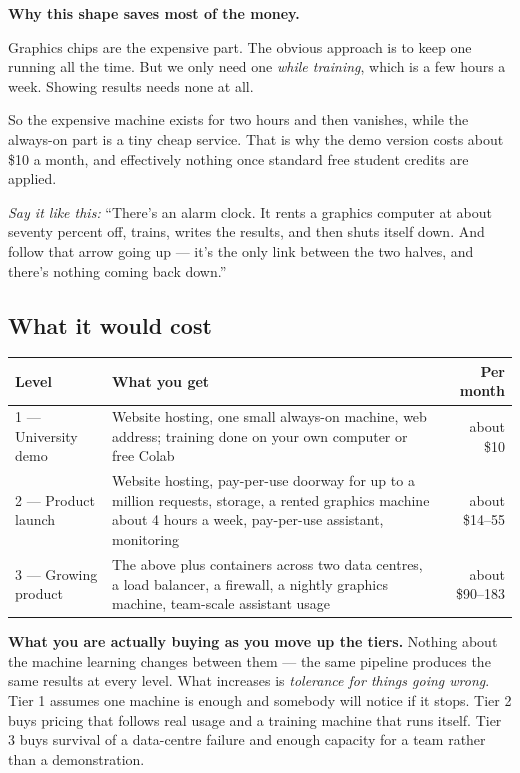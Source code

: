 \documentclass[11pt,a4paper]{article}
\newcommand{\aloud}[1]{\par\smallskip\noindent\textit{\textcolor{accent}{Say
it like this:}} ``#1''\par\smallskip}
\begin{document}
\begin{keybox}
\textbf{Why this shape saves most of the money.}

Graphics chips are the expensive part. The obvious approach is to keep one
running all the time. But we only need one \emph{while training}, which is a few
hours a week. Showing results needs none at all.

So the expensive machine exists for two hours and then vanishes, while the
always-on part is a tiny cheap service. That is why the demo version costs about
\$10 a month, and effectively nothing once standard free student credits are
applied.
\end{keybox}

\aloud{There's an alarm clock. It rents a graphics computer at about seventy
percent off, trains, writes the results, and then shuts itself down. And follow
that arrow going up --- it's the only link between the two halves, and there's
nothing coming back down.}

\subsection{What it would cost}

\begin{center}\small
\begin{tabular}{@{}p{4.4cm}p{7.4cm}r@{}}
\toprule
\textbf{Level} & \textbf{What you get} & \textbf{Per month} \\
\midrule
1 --- University demo & Website hosting, one small always-on machine, web address;
training done on your own computer or free Colab & about \$10 \\
2 --- Product launch & Website hosting, pay-per-use doorway for up to a million
requests, storage, a rented graphics machine about 4 hours a week,
pay-per-use assistant, monitoring & about \$14--55 \\
3 --- Growing product & The above plus containers across two data centres, a load
balancer, a firewall, a nightly graphics machine, team-scale assistant usage &
about \$90--183 \\
\bottomrule
\end{tabular}
\end{center}

\textbf{What you are actually buying as you move up the tiers.} Nothing about
the machine learning changes between them --- the same pipeline produces the
same results at every level. What increases is \emph{tolerance for things going
wrong}. Tier 1 assumes one machine is enough and somebody will notice if it
stops. Tier 2 buys pricing that follows real usage and a training machine that
runs itself. Tier 3 buys survival of a data-centre failure and enough capacity
for a team rather than a demonstration.
\end{document}
